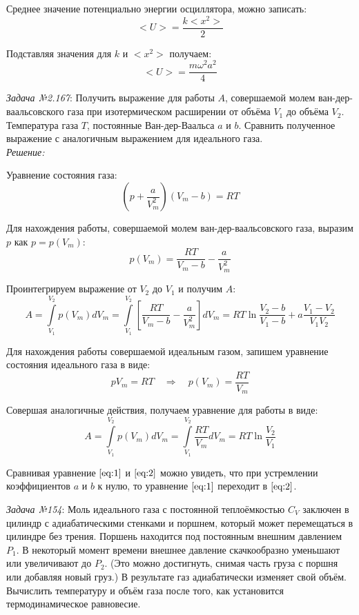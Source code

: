 \documentclass[14pt,final,titlepage,pscyr]{hedsemwork}
\begin{document}
Среднее значение потенциально энергии осциллятора, можно записать:
\[
	<U> = \frac{k<x^2>}{2}
\]

Подставляя значения для \( k \) и \( <x^2> \) получаем:
\[
	<U> = \frac{m\omega^2 a^2}{4}
\]

\newpage
\emph{Задача №2.167}: Получить выражение для работы \( A \), совершаемой 
молем ван-дер-ваальсовского газа при изотермическом расширении от объёма 
\( V_1 \) до объёма \( V_2 \). Температура газа \( T \), постоянные 
Ван-дер-Ваальса \( a \) и \( b \). Сравнить полученное выражение с 
аналогичным выражением для идеального газа. \\

\emph{Решение:}

Уравнение состояния газа:
\[
	\left( p + \frac{a}{V^2_m} \right)\left( V_m - b \right) = RT
\]

Для нахождения работы, совершаемой молем ван-дер-ваальсовского газа, 
выразим \( p \) как \( p = p(V_m) \):
\[
	p(V_m) = \frac{RT}{V_m - b} - \frac{a}{V^2_m}
\]

Проинтегрируем выражение от \( V_2 \) до \( V_1 \) и получим \( A \):
\begin{equation}
	A = \int\limits_{V_1}^{V_2} p(V_m) dV_m = 
		\int\limits_{V_1}^{V_2} \left[ 
			\frac{RT}{V_m - b} - \frac{a}{V^2_m}
		\right] dV_m = 
		RT\ln\frac{V_2 - b}{V_1 - b} + a\frac{V_1 - V_2}{V_1 V_2}
	\label{eq:1}
\end{equation}

Для нахождения работы совершаемой идеальным газом, запишем уравнение 
состояния идеального газа в виде:
\[
	pV_m = RT \quad\Rightarrow\quad p(V_m) = \frac{RT}{V_m} 
\]

Совершая аналогичные действия, получаем уравнение для работы в виде:
\begin{equation}
	A = \int\limits_{V_1}^{V_2} p(V_m) dV_m = 
		\int\limits_{V_1}^{V_2} \frac{RT}{V_m} dV_m = 
		RT\ln\frac{V_2}{V_1}
	\label{eq:2}
\end{equation}

Сравнивая уравнение \( \ref{eq:1} \) и \( \ref{eq:2} \) можно увидеть, что 
при устремлении коэффициентов \( a \) и \( b \) к нулю, то уравнение 
\( \ref{eq:1} \) переходит в \( \ref{eq:2} \).

\newpage
\emph{Задача №154}: Моль идеального газа с постоянной теплоёмкостью 
\( C_V \) заключен в цилиндр с адиабатическими стенками и поршнем, который 
может перемещаться в цилиндре без трения. Поршень находится под постоянным 
внешним давлением \( P_1 \). В некоторый момент времени внешнее давление 
скачкообразно уменьшают или увеличивают до \( P_2 \). (Это можно 
достигнуть, снимая часть груза с поршня или добавляя новый груз.) В 
результате газ адиабатически изменяет свой объём. Вычислить температуру и 
объём газа после того, как установится термодинамическое равновесие. \\
\end{document}
